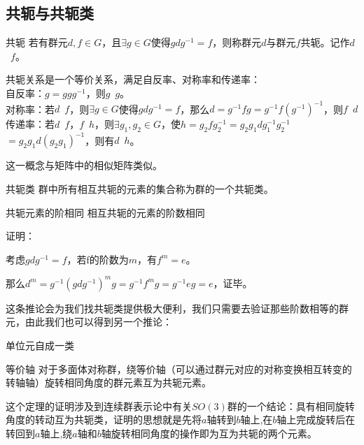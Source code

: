 

\subsection{共轭与共轭类}

\begin{definition}{共轭}
若有群元$d,f\in G$，且$\exists g\in G$使得$gdg^{-1}=f$，则称群元$d$与群元$f$共轭。记作$d$~$f$。
\end{definition}

共轭关系是一个等价关系，满足自反率、对称率和传递率：\\
自反率：$g=ggg^{-1}$，则$g$~$g$。 \\
对称率：若$d$~$f$，则$\exists g\in G$使得$gdg^{-1}=f$，那么$d=g^{-1}fg=
g^{-1}f(g^{-1})^{-1}$，则$f$~$d$ \\
传递率：若$d$~$f$，$f$~$h$，则$\exists g_1,g_2\in G$，使$h=g_2fg_2^{-1}=
g_2g_1dg_1^{-1}g_2^{-1}$ $=g_2g_1d(g_2g_1)^{-1}$，则有$d$~$h$。

这一概念与矩阵中的相似矩阵类似。

\begin{definition}{共轭类}
群中所有相互共轭的元素的集合称为群的一个共轭类。
\end{definition}

\begin{corollary}{共轭元素的阶相同}
相互共轭的元素的阶数相同
\end{corollary}
证明： 

考虑$gdg^{-1}=f$，若f的阶数为$m$，有$f^m=e$。

那么$d^m=g^{-1}(gdg^{-1})^mg=g^{-1}f^mg=g^{-1}eg=e$，证毕。

这条推论会为我们找共轭类提供极大便利，我们只需要去验证那些阶数相等的群元，由此我们也可以得到另一个推论：
\begin{corollary}{}
单位元自成一类
\end{corollary}
\begin{corollary}{等价轴}
对于多面体对称群，绕等价轴（可以通过群元对应的对称变换相互转变的转轴轴）旋转相同角度的群元素互为共轭元素。
\end{corollary}

这个定理的证明涉及到连续群表示论中有关$SO(3)$群的一个结论：具有相同旋转角度的转动互为共轭类，证明的思想就是先将$a$轴转到$b$轴上,在$b$轴上完成旋转后在转回到$a$轴上,绕$a$轴和$b$轴旋转相同角度的操作即为互为共轭的两个元素。

